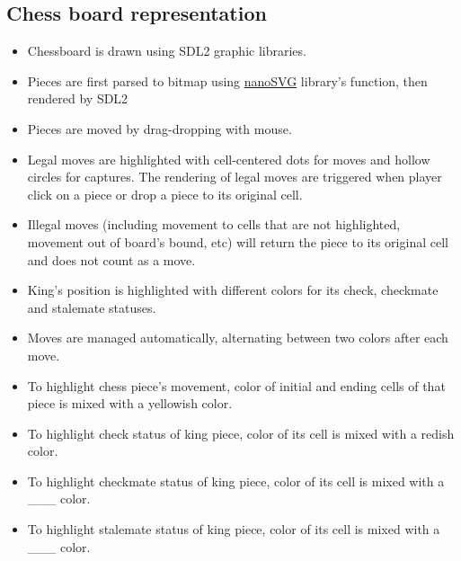 \documentclass[a4paper, 10pt, titlepage]{article}
\begin{document}
\subsection{Chess board representation}
\begin{itemize}
    \item Chessboard is drawn using SDL2 graphic libraries.
    \item Pieces are first parsed to bitmap using \href{https://github.com/memononen/nanosvg}{nanoSVG} library's function, then rendered by SDL2
    \item Pieces are moved by drag-dropping with mouse.
    \item Legal moves are highlighted with cell-centered dots for moves and hollow circles for captures. The rendering of legal moves are triggered when player click on a piece or drop a piece to its original cell.
    \item Illegal moves (including movement to cells that are not highlighted, movement out of board's bound, etc) will return the piece to its original cell and does not count as a move.
    \item King's position is highlighted with different colors for its check, checkmate and stalemate statuses.
    \item Moves are managed automatically, alternating between two colors after each move.
    \item To highlight chess piece's movement, color of initial and ending cells of that piece is mixed with a yellowish color.
    \item To highlight check status of king piece, color of its cell is mixed with a redish color.
    \item To highlight checkmate status of king piece, color of its cell is mixed with a \_\_\_ color.
    \item To highlight stalemate status of king piece, color of its cell is mixed with a \_\_\_ color.
\end{itemize}
\end{document}
